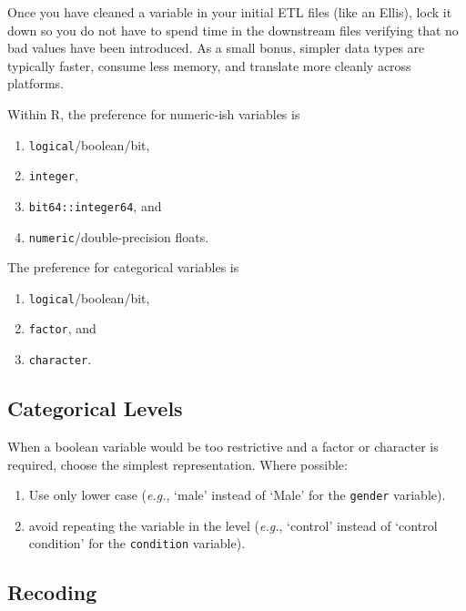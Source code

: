 \documentclass[
]{book}
\providecommand{\tightlist}{%
  \setlength{\itemsep}{0pt}\setlength{\parskip}{0pt}}
\begin{document}
Once you have cleaned a variable in your initial ETL files (like an Ellis), lock it down so you do not have to spend time in the downstream files verifying that no bad values have been introduced. As a small bonus, simpler data types are typically faster, consume less memory, and translate more cleanly across platforms.

Within R, the preference for numeric-ish variables is

\begin{enumerate}
\def\labelenumi{\arabic{enumi}.}
\tightlist
\item
  \texttt{logical}/boolean/bit,
\item
  \texttt{integer},
\item
  \texttt{bit64::integer64}, and
\item
  \texttt{numeric}/double-precision floats.
\end{enumerate}

The preference for categorical variables is

\begin{enumerate}
\def\labelenumi{\arabic{enumi}.}
\tightlist
\item
  \texttt{logical}/boolean/bit,
\item
  \texttt{factor}, and
\item
  \texttt{character}.
\end{enumerate}

\hypertarget{categorical-levels}{%
\subsection{Categorical Levels}\label{categorical-levels}}

When a boolean variable would be too restrictive and a factor or character is required, choose the simplest representation. Where possible:

\begin{enumerate}
\def\labelenumi{\arabic{enumi}.}
\tightlist
\item
  Use only lower case (\emph{e.g.}, `male' instead of `Male' for the \texttt{gender} variable).
\item
  avoid repeating the variable in the level (\emph{e.g.}, `control' instead of `control condition' for the \texttt{condition} variable).
\end{enumerate}

\hypertarget{recoding}{%
\subsection{Recoding}\label{recoding}}
\end{document}
